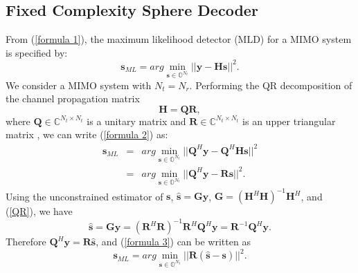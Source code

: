 \documentclass[letterpaper, 10pt, conference, twoside]{ieeeconf}
\begin{document}
\subsection{Fixed Complexity Sphere Decoder}
From (\ref{formula 1}), the maximum likelihood detector (MLD) for a MIMO system is specified by:
\begin{equation}
\mathbf{s}_{ML}=arg\min_{\mathbf{s}\in \mathbb{O}^{N_{t}}}||\mathbf{y}-\mathbf{H}\mathbf{s}||^{2}. \label{formula 2}
\end{equation}
We consider a MIMO system with  $N_{t}=N_{r}$. Performing the QR decomposition of the channel propagation matrix
\begin{equation}
 \mathbf{H}=\mathbf{Q}\mathbf{R},  \label{QR}
\end{equation}
where $\mathbf{Q}\in \mathbb{C}^{N_{t}\times N_{t}}$ is a unitary matrix and $\mathbf{R}\in \mathbb{C}^{N_{t}\times N_{t}}$ is an upper triangular matrix \cite{golub2012matrix}, we can write (\ref{formula 2}) as:
\begin{eqnarray}
\nonumber
\mathbf{s}_{ML}&=&arg\min_{\mathbf{s}\in \mathbb{O}^{N_{t}}}||\mathbf{Q}^{H}\mathbf{y}-\mathbf{Q}^{H}\mathbf{H}\mathbf{s}||^{2}\\
&=& arg\min_{\mathbf{s}\in \mathbb{O}^{N_{t}}}||\mathbf{Q}^{H}\mathbf{y}-\mathbf{R}\mathbf{s}||^{2}. \label{formula 3}
\end{eqnarray}
Using the unconstrained estimator of $\mathbf{s}$, $\mathbf{\hat{s}}=\mathbf{G}\mathbf{y}$, $\mathbf{G}=(\mathbf{H}^{H}\mathbf{H})^{-1}\mathbf{H}^{H}$, and (\ref{QR}), we have  
\begin{equation}
\mathbf{\hat{s}}=\mathbf{G}\mathbf{y}=(\mathbf{R}^{H}\mathbf{R})^{-1}\mathbf{R}^{H}\mathbf{Q}^{H}\mathbf{y}
=\mathbf{R}^{-1}\mathbf{Q}^{H}\mathbf{y}.
\label{unconstrained estimation}
\end{equation} 
Therefore $\mathbf{Q}^{H}\mathbf{y}=\mathbf{R}\mathbf{\hat{s}}$, and (\ref{formula 3}) can be written as
\begin{equation}
\mathbf{s}_{ML}=arg\min_{\mathbf{s}\in \mathbb{O}^{N_{t}}}||\mathbf{R}(\mathbf{\hat{s}}-\mathbf{s})||^{2}. \label{formula 4}
\end{equation}
\end{document}
